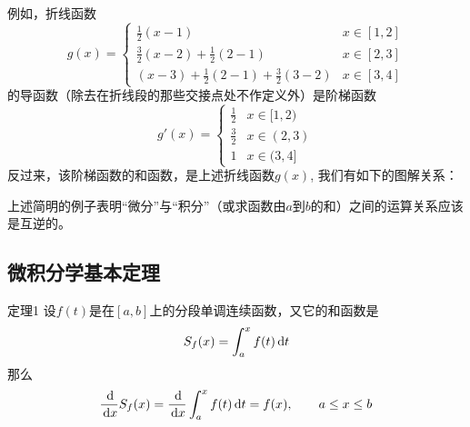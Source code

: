 例如，折线函数
\[g(x)=\begin{cases}
    \frac{1}{2}(x-1) & x\in[1,2]\\
    \frac{3}{2}(x-2)+\frac{1}{2}(2-1) & x\in [2,3]\\
    (x-3)+\frac{1}{2}(2-1)+\frac{3}{2}(3-2) & x\in [3,4]
\end{cases}\]
的导函数（除去在折线段的那些交接点处不作定义外）是阶梯函数
\[g'(x)=\begin{cases}
    \frac{1}{2} & x\in [1,2)\\
    \frac{3}{2} & x\in (2,3)\\
    1& x\in (3,4]
\end{cases}\]
反过来，该阶梯函数的和函数，是上述折线函数$g(x)$, 我们有如下的图解关系：
\begin{center}
\end{center}

上述简明的例子表明“微分”与“积分”（或求函数由$a$到$b$的和）之间的运算关系应该是互逆的。

\subsection{微积分学基本定理}

\begin{blk}
  {定理1} 设$f(t)$是在$[a,b]$上的分段单调连续函数，又它的和函数是
\[S_f(x)=\int^x_a f (t) \,{\rm d} t\]
那么
\[\dfrac{\,{\rm d} }{\,{\rm d} x}S_f(x)=\dfrac{\,{\rm d} }{\,{\rm d} x}\int^x_a f (t) \,{\rm d} t=f(x),\qquad a\le x\le b\]
\end{blk}






